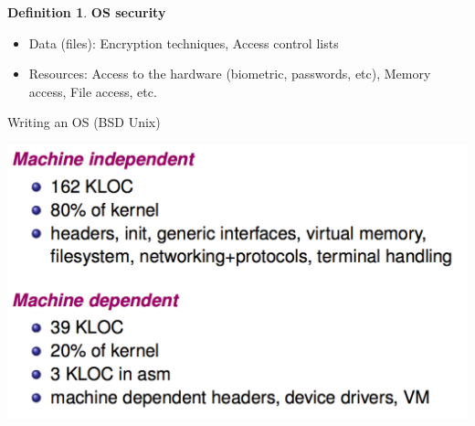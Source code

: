 \documentclass[11pt,a4paper]{article}
\theoremstyle{definition}
\newtheorem{definition}{Definition}[section]
\newenvironment{myitemize}
{ \begin{itemize}
    \setlength{\itemsep}{5pt}
    \setlength{\parskip}{0pt}
    \setlength{\parsep}{0pt}     }
{ \end{itemize}                  }
\begin{document}
\begin{definition}{\textbf{OS security}}
	\begin{myitemize}
		\item Data (files): Encryption techniques, Access control lists
		\item Resources: Access to the hardware (biometric, passwords, etc), Memory access, File access, etc.
	\end{myitemize}
\end{definition}

\begin{tcolorbox}
	\textsf{Writing an OS (BSD Unix)}
	
	\includegraphics[scale=0.3]{m1/writingOS}
	\centering
\end{tcolorbox}
\end{document}
